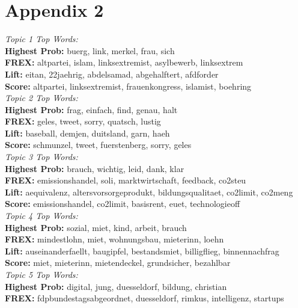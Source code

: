 \section{Appendix 2}

\noindent
\textit{Topic 1 Top Words:}\\
 	 \textbf{Highest Prob:} buerg, link, merkel, frau, sich \\
 	 \textbf{FREX:} altpartei, islam, linksextremist, asylbewerb, linksextrem \\
 	 \textbf{Lift:} eitan, 22jaehrig, abdelsamad, abgehalftert, afdforder \\
 	 \textbf{Score:} altpartei, linksextremist, frauenkongress, islamist, boehring \\
\textit{Topic 2 Top Words:}\\
 	 \textbf{Highest Prob:} frag, einfach, find, genau, halt \\
 	 \textbf{FREX:} geles, tweet, sorry, quatsch, lustig \\
 	 \textbf{Lift:} baseball, demjen, duitsland, garn, haeh \\
 	 \textbf{Score:} schmunzel, tweet, fuerstenberg, sorry, geles \\
\textit{Topic 3 Top Words:}\\
 	 \textbf{Highest Prob:} brauch, wichtig, leid, dank, klar \\
 	 \textbf{FREX:} emissionshandel, soli, marktwirtschaft, feedback, co2steu \\
 	 \textbf{Lift:} aequivalenz, altersvorsorgeprodukt, bildungsqualitaet, co2limit, co2meng \\
 	 \textbf{Score:} emissionshandel, co2limit, basisrent, euet, technologieoff \\
\textit{Topic 4 Top Words:}\\
 	 \textbf{Highest Prob:} sozial, miet, kind, arbeit, brauch \\
 	 \textbf{FREX:} mindestlohn, miet, wohnungsbau, mieterinn, loehn \\
 	 \textbf{Lift:} auseinanderfaellt, baugipfel, bestandsmiet, billigflieg, binnennachfrag \\
 	 \textbf{Score:} miet, mieterinn, mietendeckel, grundsicher, bezahlbar \\
\textit{Topic 5 Top Words:}\\
 	 \textbf{Highest Prob:} digital, jung, duesseldorf, bildung, christian \\
 	 \textbf{FREX:} fdpbundestagsabgeordnet, duesseldorf, rimkus, intelligenz, startups \\
